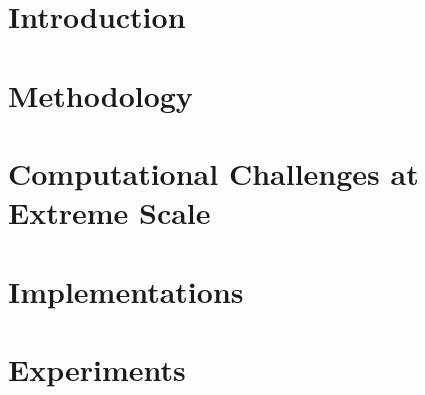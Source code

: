 \documentclass{bmcart}
\begin{document}

% 


\section{Introduction}\label{sec:intro}



\section{Methodology}\label{sec:meth}





\section{Computational Challenges at Extreme Scale}\label{sec:3}



\section{Implementations}\label{sec:4}





\section{Experiments}\label{sec:6}

\end{document}
